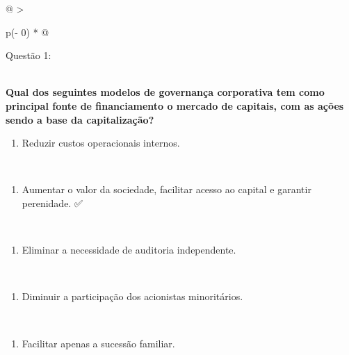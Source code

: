 \documentclass[
]{book}
\providecommand{\tightlist}{%
  \setlength{\itemsep}{0pt}\setlength{\parskip}{0pt}}
\begin{document}
\begin{longtable}[]{@{}
  >{\raggedright\arraybackslash}p{(\columnwidth - 0\tabcolsep) * }@{}}
\toprule\noalign{}
\begin{minipage}[b]{\linewidth}\raggedright
Questão 1:
\end{minipage} \\
\midrule\noalign{}
\endhead
\bottomrule\noalign{}
\endlastfoot
\textbf{Qual dos seguintes modelos de governança corporativa tem como principal fonte de financiamento o mercado de capitais, com as ações sendo a base da capitalização?} \\
\begin{minipage}[t]{\linewidth}\raggedright
\begin{enumerate}
\def\labelenumi{\alph{enumi})}
\tightlist
\item
  Reduzir custos operacionais internos.
\end{enumerate}
\end{minipage} \\
\begin{minipage}[t]{\linewidth}\raggedright
\begin{enumerate}
\def\labelenumi{\alph{enumi})}
\setcounter{enumi}{1}
\tightlist
\item
  Aumentar o valor da sociedade, facilitar acesso ao capital e garantir perenidade. ✅
\end{enumerate}
\end{minipage} \\
\begin{minipage}[t]{\linewidth}\raggedright
\begin{enumerate}
\def\labelenumi{\alph{enumi})}
\setcounter{enumi}{2}
\tightlist
\item
  Eliminar a necessidade de auditoria independente.
\end{enumerate}
\end{minipage} \\
\begin{minipage}[t]{\linewidth}\raggedright
\begin{enumerate}
\def\labelenumi{\alph{enumi})}
\setcounter{enumi}{3}
\tightlist
\item
  Diminuir a participação dos acionistas minoritários.
\end{enumerate}
\end{minipage} \\
\begin{minipage}[t]{\linewidth}\raggedright
\begin{enumerate}
\def\labelenumi{\alph{enumi})}
\setcounter{enumi}{4}
\tightlist
\item
  Facilitar apenas a sucessão familiar.
\end{enumerate}
\end{minipage} \\
\end{longtable}
\end{document}
